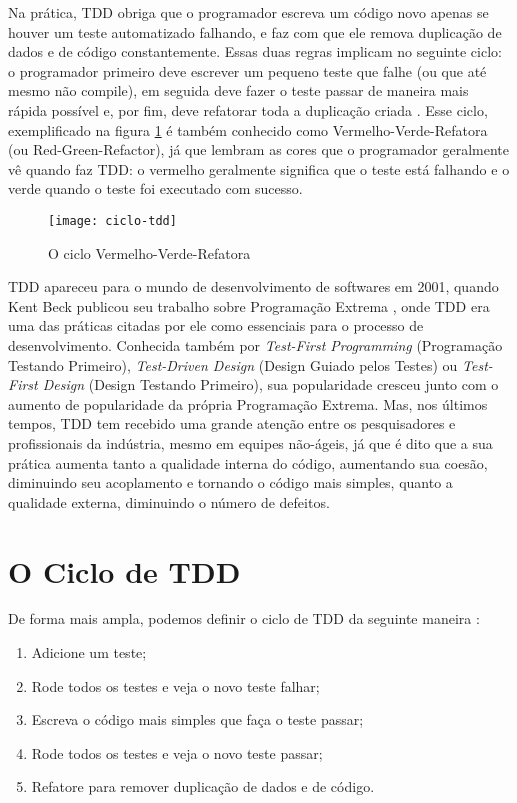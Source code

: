 Na prática, TDD obriga que o programador escreva
um código novo apenas se houver um teste automatizado falhando, e faz com que ele remova duplicação de dados e de código constantemente. 
Essas duas regras implicam no seguinte ciclo: o programador primeiro deve escrever um pequeno teste que falhe (ou que até mesmo não compile), 
em seguida deve fazer o teste passar de maneira mais rápida possível e, por fim, deve refatorar toda a duplicação criada \cite{TDDByExample}. 
Esse ciclo, exemplificado na figura \ref{fig:red-green-refactor} é também conhecido como 
Vermelho-Verde-Refatora (ou Red-Green-Refactor), já que lembram as cores que o programador geralmente 
vê quando faz TDD: o vermelho geralmente significa que o teste está falhando e o verde quando o teste foi executado com sucesso.

\begin{figure}
  \centering
  \texttt{[image: ciclo-tdd]}
  \caption{O ciclo Vermelho-Verde-Refatora}
  \label{fig:red-green-refactor}
\end{figure}

TDD apareceu para o mundo de desenvolvimento de softwares em 2001, quando Kent Beck publicou seu trabalho sobre Programação Extrema \cite{XPExplained},
onde TDD era uma das práticas citadas por ele como essenciais para o processo de desenvolvimento. Conhecida também
por \textit{Test-First Programming} (Programação Testando Primeiro), \textit{Test-Driven Design} (Design Guiado pelos Testes) ou 
\textit{Test-First Design} (Design Testando Primeiro), sua popularidade cresceu junto com o aumento de popularidade da própria Programação Extrema. 
Mas, nos últimos tempos, TDD tem recebido uma grande atenção entre os pesquisadores e profissionais da indústria, mesmo em equipes não-ágeis, já que
é dito que a sua prática aumenta tanto a qualidade interna do código, aumentando sua coesão, diminuindo seu acoplamento e tornando
o código mais simples, quanto a qualidade externa, diminuindo o número de defeitos.

\section{O Ciclo de TDD} 
\label{sec:tdd-ciclo}

De forma mais ampla, podemos definir o ciclo de TDD da seguinte maneira \cite{TDDByExample}:

\begin{enumerate}
	\item Adicione um teste; 
	\item Rode todos os testes e veja o novo teste falhar; 
	\item Escreva o código mais simples que faça o teste passar; 
	\item Rode todos os testes e veja o novo teste passar; 
	\item Refatore para remover duplicação de dados e de código.
\end{enumerate}


